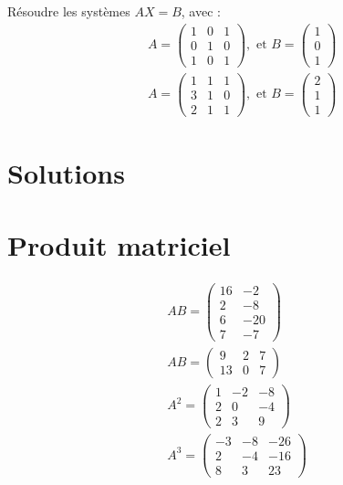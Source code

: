 Résoudre les systèmes \(A X=B\), avec :
\[
\begin{aligned}
& A=\left(\begin{array}{lll}
1 & 0 & 1 \\
0 & 1 & 0 \\
1 & 0 & 1
\end{array}\right), \text { et } B=\left(\begin{array}{l}
1 \\
0 \\
1
\end{array}\right) \\
& A=\left(\begin{array}{lll}
1 & 1 & 1 \\
3 & 1 & 0 \\
2 & 1 & 1
\end{array}\right), \text { et } B=\left(\begin{array}{l}
2 \\
1 \\
1
\end{array}\right)
\end{aligned}
\]

\section*{Solutions}

\section*{Produit matriciel}
\[
\begin{gathered}
A B=\left(\begin{array}{cc}
16 & -2 \\
2 & -8 \\
6 & -20 \\
7 & -7
\end{array}\right) \\
A B=\left(\begin{array}{ccc}
9 & 2 & 7 \\
13 & 0 & 7
\end{array}\right) \\
A^{2}=\left(\begin{array}{ccc}
1 & -2 & -8 \\
2 & 0 & -4 \\
2 & 3 & 9
\end{array}\right) \\
A^{3}=\left(\begin{array}{ccc}
-3 & -8 & -26 \\
2 & -4 & -16 \\
8 & 3 & 23
\end{array}\right)
\end{gathered}
\]

